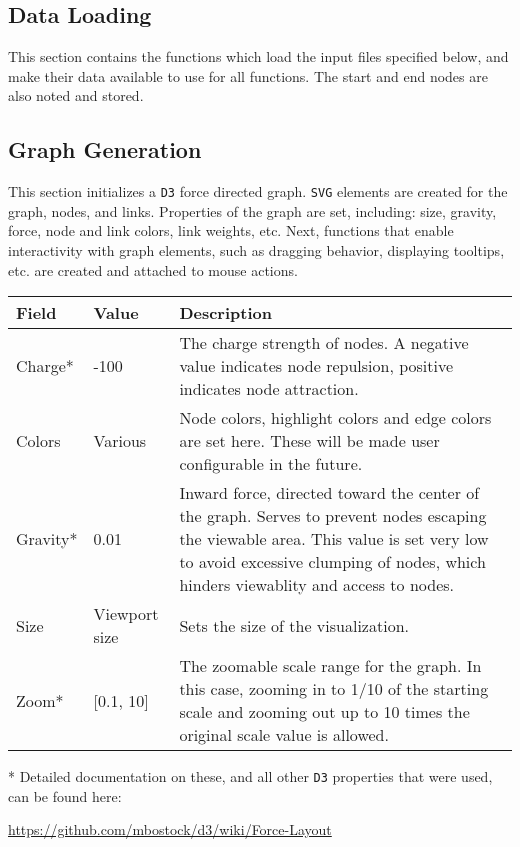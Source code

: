 \documentclass{article}
\begin{document}
			\subsection{Data Loading}{
			This section contains the functions which load the input files specified below, and make their data available to use for all functions. The start and end nodes are also noted and stored.
			}
			\subsection{Graph Generation}{
			This section initializes a \texttt{D3} force directed graph. \texttt{SVG} elements are created for the graph, nodes, and links. Properties of the graph are set, including: size, gravity, force, node and link colors, link weights, etc. Next, functions that enable interactivity with graph elements, such as dragging behavior, displaying tooltips, etc. are created and attached to mouse actions.

				\begin{center}\begin{tabular}{|p{1.75cm}|p{1.75cm}|p{10.5cm}|}
					\hline
					\textbf{Field} & \textbf{Value} & \textbf{Description}\\
					\hline
					Charge* 	& -100 & The charge strength of nodes. A negative value indicates node repulsion, positive indicates node attraction.\\
					\hline
					Colors 		& Various & Node colors, highlight colors and edge colors are set here. These will be made user configurable in the future.\\
					\hline
					Gravity* 	& 0.01 & Inward force, directed toward the center of the graph. Serves to prevent nodes escaping the viewable area. This value is set very low to avoid excessive clumping of nodes, which hinders viewablity and access to nodes. \\
					\hline
					Size 		& Viewport size & Sets the size of the visualization.\\
					\hline
					Zoom* 		& [0.1, 10] & The zoomable scale range for the graph. In this case, zooming in to 1/10 of the starting scale and zooming out up to 10 times the original scale value is allowed.\\
					\hline
					
				\end{tabular}\end{center}
				
				* Detailed documentation on these, and all other \texttt{D3} properties that were used, can be found here:
				
				\indent\url{https://github.com/mbostock/d3/wiki/Force-Layout}
			}
			
\end{document}
